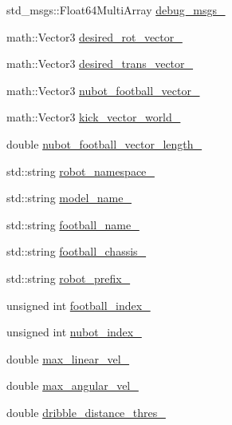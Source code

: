 \begin{DoxyCompactItemize}
std\-\_\-msgs\-::\-Float64\-Multi\-Array \hyperlink{classgazebo_1_1NubotGazebo_a73e534a19457ba3ec98e117f1cfe839f}{debug\-\_\-msgs\-\_\-}
\item 
math\-::\-Vector3 \hyperlink{classgazebo_1_1NubotGazebo_a385577ffa9cc48440e8047019d6e67f6}{desired\-\_\-rot\-\_\-vector\-\_\-}
\item 
math\-::\-Vector3 \hyperlink{classgazebo_1_1NubotGazebo_ac515996ccf0c682a0ed88f00e401373d}{desired\-\_\-trans\-\_\-vector\-\_\-}
\item 
math\-::\-Vector3 \hyperlink{classgazebo_1_1NubotGazebo_ae4b4790d24996fbfdd51f74baa45170a}{nubot\-\_\-football\-\_\-vector\-\_\-}
\item 
math\-::\-Vector3 \hyperlink{classgazebo_1_1NubotGazebo_aea8b62919e2834d4311a7fd7935036af}{kick\-\_\-vector\-\_\-world\-\_\-}
\item 
double \hyperlink{classgazebo_1_1NubotGazebo_a11fbfac7f239d13730b4d676af18f67e}{nubot\-\_\-football\-\_\-vector\-\_\-length\-\_\-}
\item 
std\-::string \hyperlink{classgazebo_1_1NubotGazebo_ac92e4461911d9522f1454978d26ec461}{robot\-\_\-namespace\-\_\-}
\item 
std\-::string \hyperlink{classgazebo_1_1NubotGazebo_adf2314dfb2ab6cb5ecdb2bb0a9736665}{model\-\_\-name\-\_\-}
\item 
std\-::string \hyperlink{classgazebo_1_1NubotGazebo_aea004ec0ee1c5dfdc8cba31939f18e39}{football\-\_\-name\-\_\-}
\item 
std\-::string \hyperlink{classgazebo_1_1NubotGazebo_a918fab93f4939a8bb06d65a997e20a54}{football\-\_\-chassis\-\_\-}
\item 
std\-::string \hyperlink{classgazebo_1_1NubotGazebo_a5d3cf2ace05ce1ade8b71d1c6397a7b0}{robot\-\_\-prefix\-\_\-}
\item 
unsigned int \hyperlink{classgazebo_1_1NubotGazebo_af45b036c2156b537d5282f63c509d1e4}{football\-\_\-index\-\_\-}
\item 
unsigned int \hyperlink{classgazebo_1_1NubotGazebo_adce69b7247cba8a3433a6cdfad5b61ef}{nubot\-\_\-index\-\_\-}
\item 
double \hyperlink{classgazebo_1_1NubotGazebo_a67f7850c63c5dd6fe80694c9a426e5ec}{max\-\_\-linear\-\_\-vel\-\_\-}
\item 
double \hyperlink{classgazebo_1_1NubotGazebo_ae9da5f6a1c7b5624dbf6bb20a2819d40}{max\-\_\-angular\-\_\-vel\-\_\-}
\item 
double \hyperlink{classgazebo_1_1NubotGazebo_a646a80199e35f2f47558b7b7aa27bea4}{dribble\-\_\-distance\-\_\-thres\-\_\-}

\end{DoxyCompactItemize}
